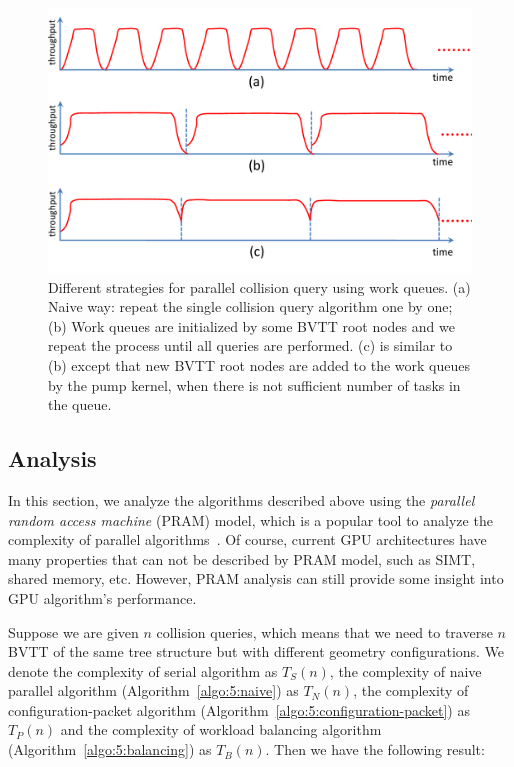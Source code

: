 \begin{figure}[htb]
  \centering
  \includegraphics[width=\linewidth]{figs/5/gproximity-parallel-differentcontrol.pdf}
  \caption[Different strategies for parallel collision query using work queues]{Different strategies for parallel collision query using work queues. (a) Naive way: repeat the single collision query algorithm one by one; (b) Work queues are initialized by some BVTT root nodes and we repeat the process until all queries are performed. (c) is similar to (b) except that new BVTT root nodes are added to the work queues by the pump kernel, when there is not sufficient number of tasks in the queue.}
  \label{fig:5:gproximity-control}
\end{figure}


\subsection{Analysis}

In this section, we analyze the algorithms described above using the \emph{parallel random access machine} (PRAM) model, which is a popular tool to analyze the complexity of parallel algorithms~\cite{Joesphbook}. Of course, current GPU architectures have many properties that can not be described by PRAM model, such as SIMT, shared memory, etc. However, PRAM analysis can still provide some insight into GPU algorithm's performance.

Suppose we are given $n$ collision queries, which means that we need to traverse $n$ BVTT of the same tree structure but with different geometry configurations. We denote the complexity of serial algorithm as $T_S(n)$, the complexity of naive parallel algorithm (Algorithm~\ref{algo:5:naive}) as $T_N(n)$, the complexity of configuration-packet algorithm (Algorithm~\ref{algo:5:configuration-packet}) as $T_P(n)$ and the complexity of workload balancing algorithm (Algorithm~\ref{algo:5:balancing}) as $T_B(n)$. Then we have the following result:

